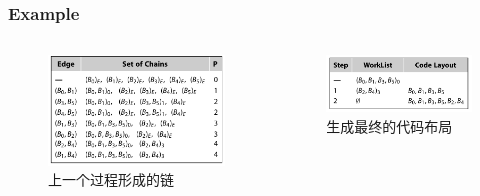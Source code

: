 \begin{frame}
    \frametitle{Example}
    \begin{columns}
        \begin{column}{0.5\textwidth}
            \begin{figure}
                \centering
                \includegraphics[width=1.0\textwidth]{images/greedy.png}
                \caption{上一个过程形成的链}
            \end{figure}
        \end{column}
        \begin{column}{0.5\textwidth}
            \begin{figure}
                \centering
                \includegraphics[width=1.0\textwidth]{images/worklist.png}
                \caption{生成最终的代码布局}
            \end{figure}
        \end{column}
    \end{columns}
\end{frame}